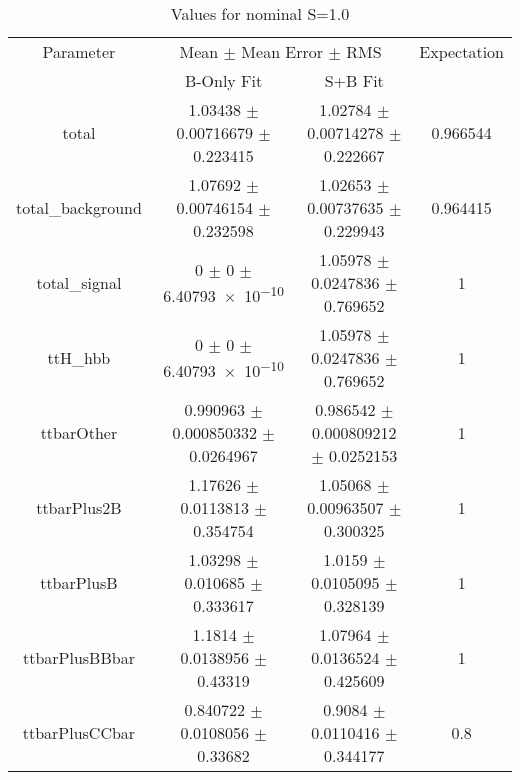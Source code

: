 \begin{table}
\centering
\caption{Values for nominal S=1.0}
\begin{tabular}{cccc}
\toprule
Parameter & \multicolumn{2}{c}{Mean $\pm$ Mean Error $\pm$ RMS} & Expectation\\
 & B-Only Fit & S+B Fit & \\
\midrule
total & \num{1.03438} $\pm$ \num{0.00716679} $\pm$ \num{0.223415} & \num{1.02784} $\pm$ \num{0.00714278} $\pm$ \num{0.222667} & \num{0.966544}\\
total\_background & \num{1.07692} $\pm$ \num{0.00746154} $\pm$ \num{0.232598} & \num{1.02653} $\pm$ \num{0.00737635} $\pm$ \num{0.229943} & \num{0.964415}\\
total\_signal & \num{0} $\pm$ \num{0} $\pm$ \num{6.40793e-10} & \num{1.05978} $\pm$ \num{0.0247836} $\pm$ \num{0.769652} & \num{1}\\
ttH\_hbb & \num{0} $\pm$ \num{0} $\pm$ \num{6.40793e-10} & \num{1.05978} $\pm$ \num{0.0247836} $\pm$ \num{0.769652} & \num{1}\\
ttbarOther & \num{0.990963} $\pm$ \num{0.000850332} $\pm$ \num{0.0264967} & \num{0.986542} $\pm$ \num{0.000809212} $\pm$ \num{0.0252153} & \num{1}\\
ttbarPlus2B & \num{1.17626} $\pm$ \num{0.0113813} $\pm$ \num{0.354754} & \num{1.05068} $\pm$ \num{0.00963507} $\pm$ \num{0.300325} & \num{1}\\
ttbarPlusB & \num{1.03298} $\pm$ \num{0.010685} $\pm$ \num{0.333617} & \num{1.0159} $\pm$ \num{0.0105095} $\pm$ \num{0.328139} & \num{1}\\
ttbarPlusBBbar & \num{1.1814} $\pm$ \num{0.0138956} $\pm$ \num{0.43319} & \num{1.07964} $\pm$ \num{0.0136524} $\pm$ \num{0.425609} & \num{1}\\
ttbarPlusCCbar & \num{0.840722} $\pm$ \num{0.0108056} $\pm$ \num{0.33682} & \num{0.9084} $\pm$ \num{0.0110416} $\pm$ \num{0.344177} & \num{0.8}\\
\bottomrule
\end{tabular}
\end{table}
